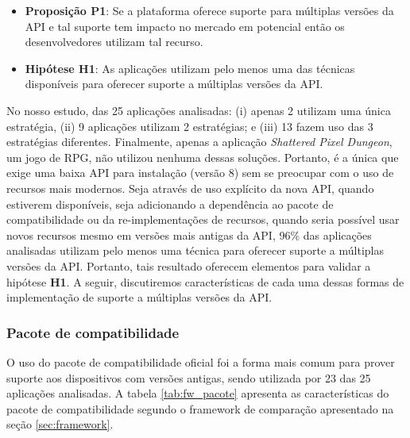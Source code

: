 \begin{itemize}
	\item \textbf{Proposição P1}: Se a plataforma oferece suporte para múltiplas versões
	da API e tal suporte tem impacto no mercado em potencial então os desenvolvedores
	utilizam tal recurso.
	\item \textbf{Hipótese H1}: As aplicações utilizam pelo menos uma das técnicas disponíveis
	para oferecer suporte a múltiplas versões da API.
\end{itemize}

No nosso estudo, das 25 aplicações analisadas: (i) apenas 2 utilizam uma única
estratégia, (ii) 9 aplicações utilizam 2 estratégias; e (iii) 13 fazem uso das
3 estratégias diferentes. Finalmente, apenas a aplicação \textit{Shattered Pixel
Dungeon}, um jogo de RPG, não utilizou nenhuma dessas soluções. Portanto, é a
única que exige uma baixa API para instalação (versão 8) sem se preocupar com
o uso de recursos mais modernos. Seja através de uso explícito da nova API,
quando estiverem disponíveis, seja adicionando a dependência ao pacote de
compatibilidade ou da re-implementações de recursos, quando seria possível
usar novos recursos mesmo em versões mais antigas da API, 96\% das aplicações
analisadas utilizam pelo menos uma técnica para oferecer suporte a múltiplas
versões da API. Portanto, tais resultado oferecem elementos
para validar a hipótese \textbf{H1}. A seguir, discutiremos características de cada
uma dessas formas de implementação de suporte a múltiplas versões da API.

\subsubsection{Pacote de compatibilidade}
O uso do pacote de compatibilidade oficial foi a forma mais comum para prover
suporte aos dispositivos com versões antigas, sendo utilizada por 23 das 25
aplicações analisadas. A tabela \ref{tab:fw_pacote} apresenta as características
do pacote de compatibilidade segundo o framework de comparação apresentado na
seção \ref{sec:framework}.


